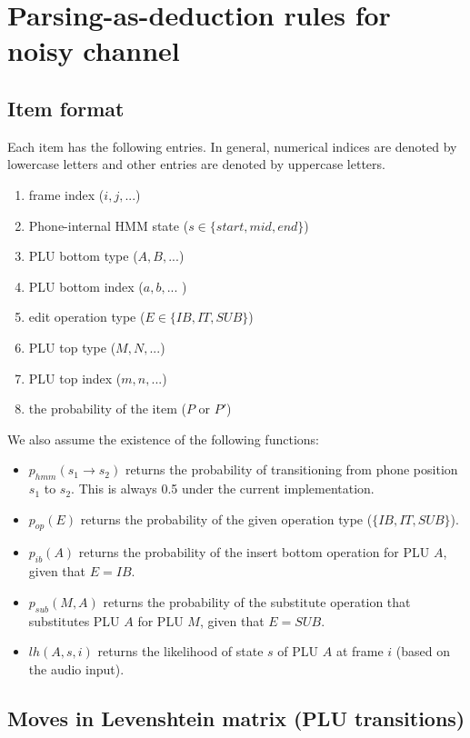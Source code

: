 \documentclass[12pt,letterpaper]{article}
\begin{document}
\section{Parsing-as-deduction rules for noisy channel}
\subsection{Item format}
Each item has the following entries. In general, numerical indices are denoted by lowercase letters and other entries are denoted by uppercase letters. 
\begin{enumerate}
\item frame index ($i, j, ...$)
\item Phone-internal HMM state ($s \in \{start, mid, end\}$)
\item PLU bottom type ($A, B, ...$)
\item PLU bottom index ($a, b, ...$ )
\item edit operation type ($E \in \{IB, IT, SUB\}$)
\item PLU top type ($M, N, ...$)
\item PLU top index ($m, n, ...$)
\item the probability of the item ($P$ or $P'$)
\end{enumerate}

\noindent We also assume the existence of the following functions:
\begin{itemize}
	\item $p_{hmm}(s_1 \rightarrow s_2)$ returns the probability of transitioning from phone position $s_1$ to $s_2$. This is always 0.5 under the current implementation.
	\item $p_{op}(E)$ returns the probability of the given operation type ($\{IB, IT, SUB\}$).
	\item $p_{ib}(A)$ returns the probability of the insert bottom operation for PLU $A$, given that $E=IB$.
	\item $p_{sub}(M,A)$ returns the probability of the substitute operation that substitutes PLU $A$ for PLU $M$, given that $E=SUB$.
		\item $lh(A,s,i)$ returns the likelihood of state $s$ of PLU $A$ at frame $i$ (based on the audio input).
\end{itemize}



\subsection{Moves in Levenshtein matrix (PLU transitions)}
\end{document}
